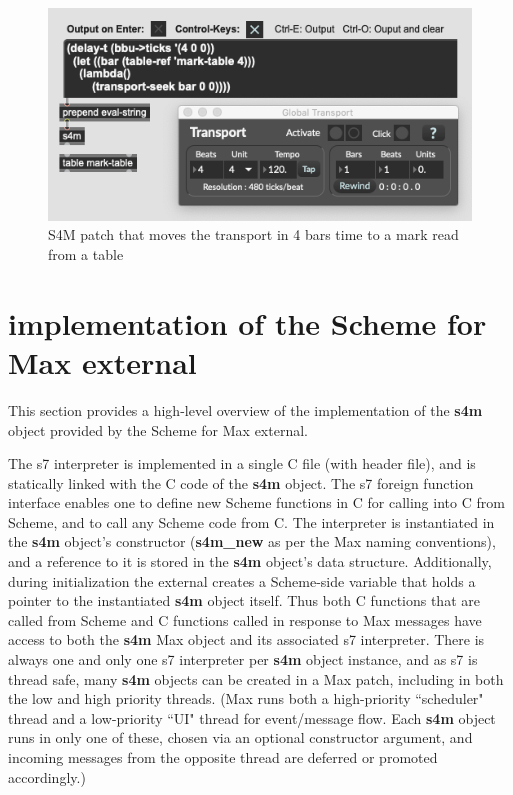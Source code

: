 \documentclass[acmsmall]{acmart}
\begin{document}
\begin{figure}[H]
  \centering
  \includegraphics[width=.75\linewidth]{fig-3-transport}
  \caption{S4M patch that moves the transport in 4 bars time to a mark read from a table}
\end{figure}



\section{implementation of the Scheme for Max external}

This section provides a high-level overview of the implementation of the \textbf{s4m} 
object provided by the Scheme for Max external.

The s7 interpreter is implemented in a single C file (with header file), 
and is statically linked with the C code of the \textbf{s4m} object. 
The s7 foreign function interface enables one to define new Scheme functions in C 
for calling into C from Scheme, and to call any Scheme code from C. 
The interpreter is instantiated
in the \textbf{s4m} object's constructor (\textbf{s4m\_new} as per the Max naming conventions), and
a reference to it is stored in the \textbf{s4m} object's data structure.
Additionally, during initialization the external creates a Scheme-side variable 
that holds a pointer to the instantiated \textbf{s4m} object itself. Thus
both C functions that are called from Scheme and C functions called in response to Max
messages have access to both the \textbf{s4m} Max object and its associated s7 interpreter.
There is always one and only one s7 interpreter per \textbf{s4m} object instance, and
as s7 is thread safe, many \textbf{s4m} objects can be created in a Max patch, including
in both the low and high priority threads. (Max runs both a high-priority ``scheduler" 
thread and a low-priority ``UI" thread for event/message flow. Each \textbf{s4m} object 
runs in only one of these, chosen via an optional constructor argument, and incoming messages
from the opposite thread are deferred or promoted accordingly.)
\end{document}
